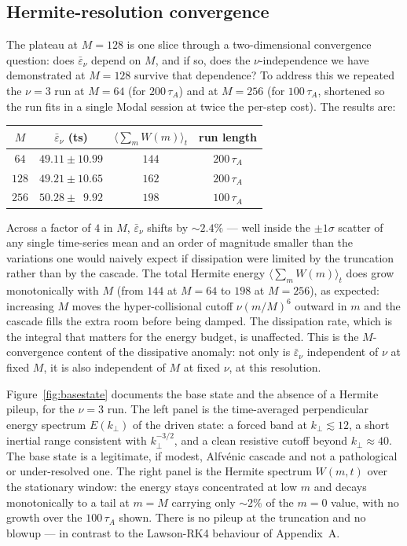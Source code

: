 \documentclass[11pt]{article}
\newcommand{\epsnu}{\varepsilon_\nu}
\newcommand{\taua}{\tau_A}
\newcommand{\kperp}{k_\perp}
\begin{document}
\subsection{Hermite-resolution convergence}
\label{sec:Mconv}

The plateau at $M = 128$ is one slice through a two-dimensional convergence question: does $\bar\epsnu$ depend on $M$, and if so, does the $\nu$-independence we have demonstrated at $M = 128$ survive that dependence? To address this we repeated the $\nu = 3$ run at $M = 64$ (for $200\,\taua$) and at $M = 256$ (for $100\,\taua$, shortened so the run fits in a single Modal session at twice the per-step cost). The results are:

\begin{center}
\begin{tabular}{cccc}
\toprule
$M$ & $\bar\epsnu$ (ts) & $\langle \sum_m W(m) \rangle_t$ & run length \\
\midrule
$64$  & $49.11 \pm 10.99$ & $144$ & $200\,\taua$ \\
$128$ & $49.21 \pm 10.65$ & $162$ & $200\,\taua$ \\
$256$ & $50.28 \pm \phantom{0}9.92$  & $198$ & $100\,\taua$ \\
\bottomrule
\end{tabular}
\end{center}

Across a factor of $4$ in $M$, $\bar\epsnu$ shifts by $\sim 2.4\%$ --- well inside the $\pm 1\sigma$ scatter of any single time-series mean and an order of magnitude smaller than the variations one would naively expect if dissipation were limited by the truncation rather than by the cascade. The total Hermite energy $\langle \sum_m W(m) \rangle_t$ does grow monotonically with $M$ (from $144$ at $M = 64$ to $198$ at $M = 256$), as expected: increasing $M$ moves the hyper-collisional cutoff $\nu(m/M)^6$ outward in $m$ and the cascade fills the extra room before being damped. The dissipation rate, which is the integral that matters for the energy budget, is unaffected. This is the $M$-convergence content of the dissipative anomaly: not only is $\bar\epsnu$ independent of $\nu$ at fixed $M$, it is also independent of $M$ at fixed $\nu$, at this resolution.

Figure~\ref{fig:basestate} documents the base state and the absence of a Hermite pileup, for the $\nu = 3$ run. The left panel is the time-averaged perpendicular energy spectrum $E(\kperp)$ of the driven state: a forced band at $\kperp \lesssim 12$, a short inertial range consistent with $\kperp^{-3/2}$, and a clean resistive cutoff beyond $\kperp \approx 40$. The base state is a legitimate, if modest, Alfv\'enic cascade and not a pathological or under-resolved one. The right panel is the Hermite spectrum $W(m, t)$ over the stationary window: the energy stays concentrated at low $m$ and decays monotonically to a tail at $m = M$ carrying only $\sim 2\%$ of the $m = 0$ value, with no growth over the $100\,\taua$ shown. There is no pileup at the truncation and no blowup --- in contrast to the Lawson-RK4 behaviour of Appendix~A.
\end{document}
